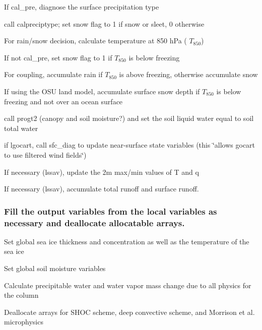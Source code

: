 \begin{DoxyItemize}
\item If \textquotesingle{}cal\+\_\+pre\textquotesingle{}, diagnose the surface precipitation type
\begin{DoxyItemize}
\item call \textquotesingle{}calpreciptype\textquotesingle{}; set snow flag to 1 if snow or sleet, 0 otherwise
\end{DoxyItemize}
\item For rain/snow decision, calculate temperature at 850 h\+Pa ( $T_{850}$)
\begin{DoxyItemize}
\item If not \textquotesingle{}cal\+\_\+pre\textquotesingle{}, set snow flag to 1 if $T_{850}$ is below freezing
\end{DoxyItemize}
\item For coupling, accumulate rain if $T_{850}$ is above freezing, otherwise accumulate snow
\item If using the O\+SU land model, accumulate surface snow depth if $T_{850}$ is below freezing and not over an ocean surface
\begin{DoxyItemize}
\item call \textquotesingle{}progt2\textquotesingle{} (canopy and soil moisture?) and set the soil liquid water equal to soil total water
\item if \textquotesingle{}lgocart\textquotesingle{}, call \textquotesingle{}sfc\+\_\+diag\textquotesingle{} to update near-\/surface state variables (this \char`\"{}allows gocart to use filtered wind fields\char`\"{})
\end{DoxyItemize}
\item If necessary (lssav), update the 2m max/min values of T and q
\item If necessary (lssav), accumulate total runoff and surface runoff.
\end{DoxyItemize}

\subsubsection*{Fill the output variables from the local variables as necessary and deallocate allocatable arrays.}


\begin{DoxyItemize}
\item Set global sea ice thickness and concentration as well as the temperature of the sea ice
\item Set global soil moisture variables
\item Calculate precipitable water and water vapor mass change due to all physics for the column
\item Deallocate arrays for S\+H\+OC scheme, deep convective scheme, and Morrison et al. microphysics 
\end{DoxyItemize}

